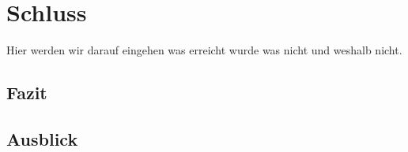 \section{Schluss}
Hier werden wir darauf eingehen was erreicht wurde was nicht und weshalb nicht.
\subsection{Fazit}
\subsection{Ausblick}